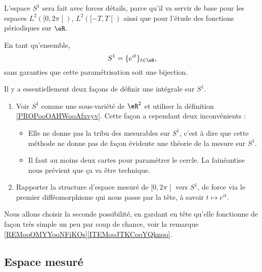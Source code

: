 L'espace \( S^1\) sera fait avec forces détails, parce qu'il va servir de base pour les espaces \( L^2(\mathopen[ 0 , 2\pi \mathclose[)\), \( L^2(\mathopen[ -T , T \mathclose[)\) ainsi que pour l'étude des fonctions périodiques sur \( \eR\).

En tant qu'ensemble,
\begin{equation}
    S^1=\{  e^{it} \}_{t\in \eR},
\end{equation}
sans garanties que cette paramétrisation soit une bijection.

Il y a essentiellement deux façons de définir une intégrale sur \( S^1\).
\begin{enumerate}
    \item Voir \( S^1\) comme une sous-variété de \( \eR^2\) et utiliser la définition \ref{PROPooOAHWooAfxvyv}. Cette façon a cependant deux inconvénients :
        \begin{itemize}
            \item Elle ne donne pas la tribu des mesurables sur \( S^1\), c'est à dire que cette méthode ne donne pas de façon évidente une théorie de la mesure sur \( S^1\).
            \item Il faut au moins deux cartes pour paramétrer le cercle. La fainéantise nous prévient que ça va être technique.
        \end{itemize}
    \item
        Rapporter la structure d'espace mesuré de \( \mathopen[ 0 , 2\pi \mathclose[\) vers \( S^1\), de force via le premier difféomorphisme qui nous passe par la tête, à savoir \( t\mapsto  e^{it}\).
\end{enumerate}
Nous allons choisir la seconde possibilité, en gardant en tête qu'elle fonctionne de façon très simple un peu par coup de chance, voir la remarque \ref{REMooOMYYooNFiKOs}\ref{ITEMooJTKCooYQknqo}.

\subsection{Espace mesuré}

